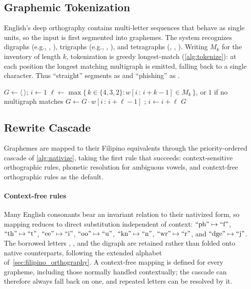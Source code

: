 \subsection{Graphemic Tokenization}

English's deep orthography contains multi-letter sequences that behave as
single units, so the input is first segmented into graphemes. The system
recognizes digraphs (e.g., , ), trigraphs (e.g., ,
), and tetragraphs (, , ). Writing $M_k$ for
the inventory of length $k$, tokenization is greedy longest-match
(\cref{alg:tokenize}): at each position the longest matching multigraph is
emitted, falling back to a single character. Thus ``straight'' segments as
 and ``phishing'' as .

\begin{algorithm}[t]
      \caption{Graphemic Tokenization}\label{alg:tokenize}
      \begin{algorithmic}[1]
            \State $G \gets \langle\,\rangle$; \quad $i \gets 1$
            \State $\ell \gets \max \{\, k \in \{4, 3, 2\} : w[i\,{:}\,i{+}k{-}1] \in M_k \,\}$,
            \State \quad or $1$ if no multigraph matches
            \State $G \gets G \cdot w[i\,{:}\,i{+}\ell{-}1]$ ; \quad $i \gets i + \ell$
            \EndWhile
            \State \Return $G$
            \EndProcedure
      \end{algorithmic}
\end{algorithm}

\subsection{Rewrite Cascade}\label{subsec:cascade}

Graphemes are mapped to their Filipino equivalents through the priority-ordered
cascade of \cref{alg:nativize}, taking the first rule that succeeds:
context-sensitive orthographic rules, phonetic resolution for ambiguous vowels,
and context-free orthographic rules as the default.

\paragraph{Context-free rules}
Many English consonants bear an invariant relation to their nativized form, so
mapping reduces to direct substitution independent of context:
$\gr{ph}\mapsto\gr{f}$, $\gr{th}\mapsto\gr{t}$, $\gr{ee}\mapsto\gr{i}$,
$\gr{oo}\mapsto\gr{u}$, $\gr{kn}\mapsto\gr{n}$, $\gr{wr}\mapsto\gr{r}$, and
$\gr{dge}\mapsto\gr{j}$. The borrowed letters , ,  and the
digraph  are retained rather than folded onto native counterparts,
following the extended alphabet of~\cref{sec:filipino_orthography}. A
context-free mapping is defined for every grapheme, including those normally
handled contextually; the cascade can therefore always fall back on one, and
repeated letters can be resolved by it.

